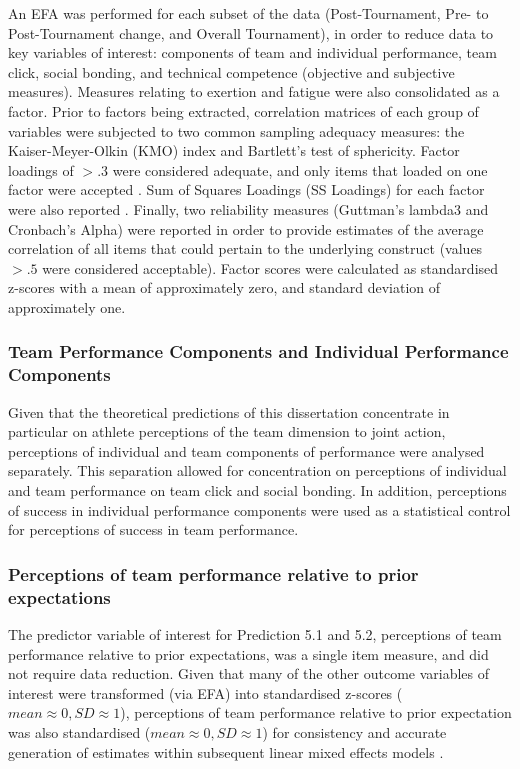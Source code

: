 \begin{CJK}{UTF8}{gbsn}
An EFA was performed for each subset of the data (Post-Tournament, Pre- to Post-Tournament change, and Overall Tournament), in order to reduce data to key variables of interest: components of team and individual performance, team click, social bonding, and technical competence (objective and subjective measures).  Measures relating to exertion and fatigue were also consolidated as a factor.  Prior to factors being extracted, correlation matrices of each group of variables were subjected to two common sampling adequacy measures: the Kaiser-Meyer-Olkin (KMO) index and Bartlett's test of sphericity.  Factor loadings of $> .3$ were considered adequate, and only items that loaded on one factor were accepted \citep{Field2012}. Sum of Squares Loadings (SS Loadings) for each factor were also reported \citep{Dziuban1974}.  Finally, two reliability measures (Guttman's lambda3 and Cronbach's Alpha) were reported in order to provide estimates of the average correlation of all items that could pertain to the underlying construct (values  $> .5$ were considered acceptable).  Factor scores were calculated as standardised z-scores with a mean of approximately zero, and standard deviation of approximately one.

\subsubsection{Team Performance Components and Individual Performance Components}
Given that the theoretical predictions of this dissertation concentrate in particular on athlete perceptions of the team dimension to joint action, perceptions of individual and team components of performance were analysed separately.  This separation allowed for concentration on perceptions of individual and team performance on team click and social bonding. In addition, perceptions of success in individual performance components were used as a statistical control for perceptions of success in team performance.


\subsubsection{Perceptions of team performance relative to prior expectations}
The predictor variable of interest for Prediction 5.1 and 5.2, perceptions of team performance relative to prior expectations, was a single item measure, and did not require data reduction.  Given that many of the other outcome variables of interest were transformed (via EFA) into standardised z-scores ($mean \approx 0, SD \approx 1$), perceptions of team performance relative to prior expectation was also standardised ($mean \approx 0, SD \approx 1$) for consistency and accurate generation of estimates within subsequent linear mixed effects models \citep{Bates2015}.


\end{CJK}
